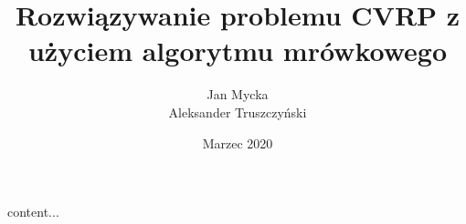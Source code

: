 \documentclass[a4paper,11pt,twoside, fleqn]{report}
\title{Rozwiązywanie problemu CVRP z użyciem algorytmu mrówkowego}
\author{Jan Mycka \\ Aleksander Truszczyński}
\date{Marzec 2020}
\begin{document}
	content...
\end{document}
